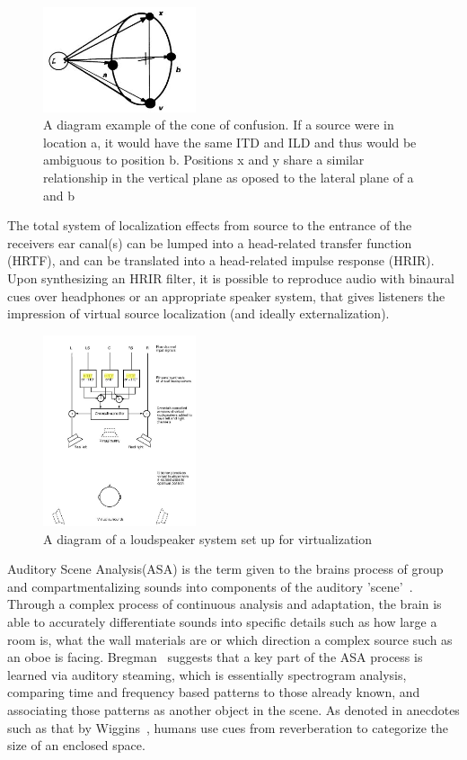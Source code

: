 \documentclass[paper=a4, fontsize=10pt, font=arial]{scrartcl} %
\numberwithin{equation}{section} %
\numberwithin{figure}{section} %
\numberwithin{table}{section} %
\begin{document}
\begin{figure}[H]
\centering
\includegraphics[width=0.4\textwidth]{coneofconfusion.jpg}
\centering
\caption{A diagram example of the cone of confusion. If a source were in location a, it would have the same ITD and ILD and thus would be ambiguous to position b. Positions x and y share a similar relationship in the vertical plane as oposed to the lateral plane of a and b~\cite{Begault1995}}
\end{figure}

The total system of localization effects from source to the entrance of the receivers ear canal(s) can be lumped into a head-related transfer function (HRTF), and can be translated into a head-related impulse response (HRIR). Upon synthesizing an HRIR filter, it is possible to reproduce audio with binaural cues over headphones or an appropriate speaker system, that gives listeners the impression of virtual source localization (and ideally externalization). 

\begin{figure}[H]
\centering
\includegraphics[width=0.4\textwidth]{virtualizationoverspeakers.JPG}
\centering
\caption{A diagram of a loudspeaker system set up for virtualization~\cite{rumsey2012spatial}}
\end{figure}

Auditory Scene Analysis(ASA) is the term given to the brains process of group and compartmentalizing sounds into components of the auditory 'scene'~\cite{rumsey2012spatial}. Through a complex process of continuous analysis and adaptation, the brain is able to accurately differentiate sounds into specific details such as how large a room is, what the wall materials are or which direction a complex source such as an oboe is facing. Bregman~\cite{Bregman1994} suggests that a key part of the ASA process is learned via auditory steaming, which is essentially spectrogram analysis, comparing time and frequency based patterns to those already known, and associating those patterns as another object in the scene. As denoted in anecdotes such as that by Wiggins~\cite{Wiggins2004}, humans use cues from reverberation to categorize the size of an enclosed space.
\end{document}
